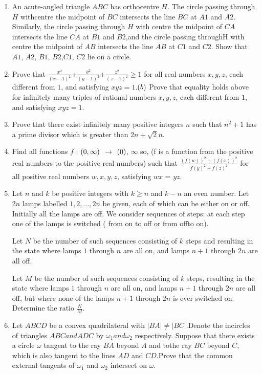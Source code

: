 \documentclass[12pt-letter paper]{article}
\begin{document}
\begin{enumerate}
\item An acute-angled triangle $ABC$ has orthocentre $H$. The circle passing through $H$ withcentre the midpoint of $BC$ intersects the line $BC$ at $A1$ and $A2$. Similarly, the circle passing through $H$ with centre the midpoint of $CA$ intersects the line $CA$ at $B1$ and $B2$,and the circle passing throughH with centre the midpoint of $AB$ intersects the line $AB$ at $C1$ and $C2$. Show that $A1$, $A2$, $B1$, $B2$,$C1$, $C2$ lie on a circle.
\item Prove that 
$\frac{x^2}{{(x-1)}^{2}}$+$\frac{y^2}{{(y-1)}^{2}}$+$\frac{z^2}{{(z-1)}^{2}} \geq 1$ 
		for all real numbers $x, y, z$, each different from $1$, and satisfying $xyz = 1$.$\left(b\right)$ Prove that equality holds above for infinitely many triples of rational numbers $x, y, z$, each different from $1$, and satisfying $xyz=1$.
\item Prove that there exist infinitely many positive integers $n$ such that $n^2+1$ has a prime divisor which is greater than $2n+\sqrt2n$.
\item Find all functions $f$ : $\left(0,\infty\right)$ $\rightarrow$ $\left(0\right)$, $\infty$  so, (f is a function from the positive real numbers to the positive real numbers) such that 
	$\frac{(f(w))^2 + (f(x))^2} {f(y)^2 + f(z)^2 }$
	for all positive real numbers $w, x, y, z$, satisfying $wx$ = $yz$.
\item  Let $n$ and $k$ be positive integers with $k\geq n$ and $k-n$ an even number. Let $2n$ lamps labelled $1, 2,\dots, 2n$ be given, each of which can be either on or off. Initially all the lamps are off.
	We consider sequences of steps: at each step one of the lamps is switched ( from on to off or from offto on).

Let $N$ be the number of such sequences consisting of $k$ steps and resulting in the state where lamps $1$ through $n$ are all on, and lamps $n + 1$ through $2n$ are all off.

Let $M$ be the number of such sequences consisting of $k$ steps, resulting in the state where lamps $1$ through $n$ are all on, and lamps $n + 1$ through $2n$ are all off, but where none of the lamps $n + 1$ through $2n$ is ever switched on.
	Determine the ratio $\frac{N}{M}$.

\item Let $ABCD$ be a convex quadrilateral with $|BA| \neq |BC|$.Denote the incircles of triangles $ABC and ADC$ by $\omega_{1} and \omega_{2}$ respectively.
	Suppose that there exists a circle $\omega$ tangent to the ray $BA$ beyond $A$ and tothe ray $BC$ beyond $C$, which is also tangent to the lines $AD$ and $CD$.Prove that the common external tangents of $\omega_{1}$ and $\omega_{2}$ intersect on $\omega$.
\end{enumerate}
\end{document}
